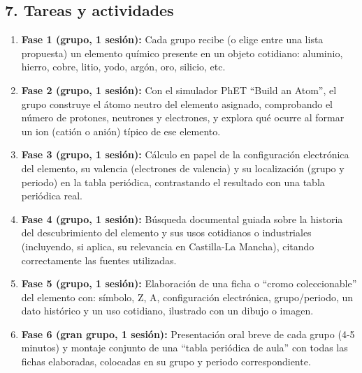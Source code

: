 \documentclass[11pt,a4paper]{article}
\begin{document}
\subsection*{7. Tareas y actividades}
\begin{enumerate}
    \item \textbf{Fase 1 (grupo, 1 sesión):} Cada grupo recibe (o elige entre una lista propuesta) un elemento químico presente en un objeto cotidiano: aluminio, hierro, cobre, litio, yodo, argón, oro, silicio, etc.
    \item \textbf{Fase 2 (grupo, 1 sesión):} Con el simulador PhET ``Build an Atom'', el grupo construye el átomo neutro del elemento asignado, comprobando el número de protones, neutrones y electrones, y explora qué ocurre al formar un ion (catión o anión) típico de ese elemento.
    \item \textbf{Fase 3 (grupo, 1 sesión):} Cálculo en papel de la configuración electrónica del elemento, su valencia (electrones de valencia) y su localización (grupo y periodo) en la tabla periódica, contrastando el resultado con una tabla periódica real.
    \item \textbf{Fase 4 (grupo, 1 sesión):} Búsqueda documental guiada sobre la historia del descubrimiento del elemento y sus usos cotidianos o industriales (incluyendo, si aplica, su relevancia en Castilla-La Mancha), citando correctamente las fuentes utilizadas.
    \item \textbf{Fase 5 (grupo, 1 sesión):} Elaboración de una ficha o ``cromo coleccionable'' del elemento con: símbolo, Z, A, configuración electrónica, grupo/periodo, un dato histórico y un uso cotidiano, ilustrado con un dibujo o imagen.
    \item \textbf{Fase 6 (gran grupo, 1 sesión):} Presentación oral breve de cada grupo (4-5 minutos) y montaje conjunto de una ``tabla periódica de aula'' con todas las fichas elaboradas, colocadas en su grupo y periodo correspondiente.
\end{enumerate}
\end{document}
